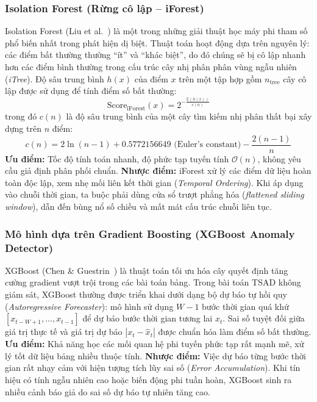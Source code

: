 \documentclass[11pt,journal,onecolumn]{IEEEtran}
\begin{document}
\subsubsection{Isolation Forest (Rừng cô lập -- iForest)}
Isolation Forest (Liu et al.~\cite{liu2008isolation}) là một trong những giải thuật học máy phi tham số phổ biến nhất trong phát hiện dị biệt. Thuật toán hoạt động dựa trên nguyên lý: các điểm bất thường thường ``ít'' và ``khác biệt'', do đó chúng sẽ bị cô lập nhanh hơn các điểm bình thường trong cấu trúc cây nhị phân phân vùng ngẫu nhiên (\textit{iTree}).
Độ sâu trung bình $h(x)$ của điểm $x$ trên một tập hợp gồm $n_{\text{tree}}$ cây cô lập được sử dụng để tính điểm số bất thường:
\begin{equation}
\label{eq:iforest_score}
\text{Score}_{\text{iForest}}(x) = 2^{-\frac{\mathbb{E}(h(x))}{c(n)}}
\end{equation}
trong đó $c(n)$ là độ sâu trung bình của một cây tìm kiếm nhị phân thất bại xây dựng trên $n$ điểm:
\begin{equation}
c(n) = 2 \ln(n - 1) + 0.5772156649 \text{ (Euler's constant)} - \frac{2(n-1)}{n}
\end{equation}
\textbf{Ưu điểm:} Tốc độ tính toán nhanh, độ phức tạp tuyến tính $\mathcal{O}(n)$, không yêu cầu giả định phân phối chuẩn.
\textbf{Nhược điểm:} iForest xử lý các điểm dữ liệu hoàn toàn độc lập, xem nhẹ mối liên kết thời gian (\textit{Temporal Ordering}). Khi áp dụng vào chuỗi thời gian, ta buộc phải dùng cửa sổ trượt phẳng hóa (\textit{flattened sliding window}), dẫn đến bùng nổ số chiều và mất mát cấu trúc chuỗi liên tục.

\subsubsection{Mô hình dựa trên Gradient Boosting (XGBoost Anomaly Detector)}
XGBoost (Chen \& Guestrin~\cite{chen2016xgboost}) là thuật toán tối ưu hóa cây quyết định tăng cường gradient vượt trội trong các bài toán bảng. Trong bài toán TSAD không giám sát, XGBoost thường được triển khai dưới dạng bộ dự báo tự hồi quy (\textit{Autoregressive Forecaster}): mô hình sử dụng $W-1$ bước thời gian quá khứ $[x_{t-W+1}, \dots, x_{t-1}]$ để dự báo bước thời gian tương lai $x_t$. Sai số tuyệt đối giữa giá trị thực tế và giá trị dự báo $|x_t - \hat{x}_t|$ được chuẩn hóa làm điểm số bất thường.
\textbf{Ưu điểm:} Khả năng học các mối quan hệ phi tuyến phức tạp rất mạnh mẽ, xử lý tốt dữ liệu bảng nhiều thuộc tính.
\textbf{Nhược điểm:} Việc dự báo từng bước thời gian rất nhạy cảm với hiện tượng tích lũy sai số (\textit{Error Accumulation}). Khi tín hiệu có tính ngẫu nhiên cao hoặc biến động phi tuần hoàn, XGBoost sinh ra nhiều cảnh báo giả do sai số dự báo tự nhiên tăng cao.
\end{document}
